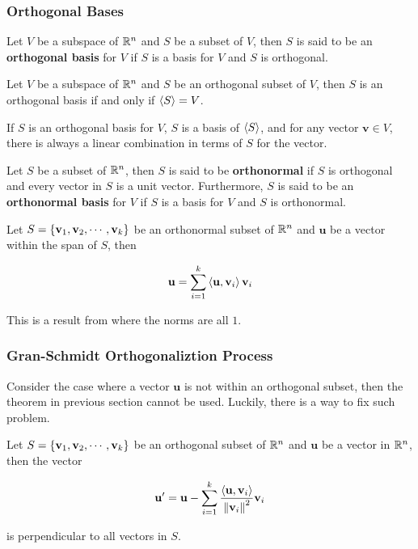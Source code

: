 \documentclass[a4paper,12pt]{article}
\begin{document}
\subsubsection{Orthogonal Bases}
\begin{dft}
  Let $V$ be a subspace of $\mathbb{R}^{n}$ and $S$ be a subset of $V$, then $S$ is said to be an \textbf{orthogonal basis} for $V$ if $S$ is a basis for $V$ and $S$ is orthogonal.
\end{dft}\n

\begin{thm}
  Let $V$ be a subspace of $\mathbb{R}^{n}$ and $S$ be an orthogonal subset of $V$, then $S$ is an orthogonal basis if and only if $\left\langle S\right\rangle=V$.
\end{thm}\n

\begin{crl}
  If $S$ is an orthogonal basis for $V$, $S$ is a basis of $\left\langle S\right\rangle$, and for any vector $\mathbf{v}\in V$, there is always a linear combination in terms of $S$ for the vector.
\end{crl}\n

\begin{dft}
  Let $S$ be a subset of $\mathbb{R}^{n}$, then $S$ is said to be \textbf{orthonormal} if $S$ is orthogonal and every vector in $S$ is a unit vector. Furthermore, $S$ is said to be an \textbf{orthonormal basis} for $V$ if $S$ is a basis for $V$ and $S$ is orthonormal.
\end{dft}\n

\begin{thm}
  Let $S=\left\{ \mathbf{v}_{1},\mathbf{v}_{2},\cdots,\mathbf{v}_{k}\right\}$ be an orthonormal subset of $\mathbb{R}^{n}$ and $\mathbf{u}$ be a vector within the span of $S$, then
  
  $$\mathbf{u}=\sum_{i=1}^{k}\left\langle \mathbf{u},\mathbf{v}_{i}\right\rangle\mathbf{v}_{i}$$\s
  
  \prf This is a result from \rthm[\sctd{5}] where the norms are all $1$.
\end{thm}

\subsubsection{Gran-Schmidt Orthogonaliztion Process}
Consider the case where a vector $\mathbf{u}$ is not within an orthogonal subset, then the theorem in previous section cannot be used. Luckily, there is a way to fix such problem.\n

\begin{thm}
  Let $S=\left\{ \mathbf{v}_{1},\mathbf{v}_{2},\cdots,\mathbf{v}_{k}\right\}$ be an orthogonal subset of $\mathbb{R}^{n}$ and $\mathbf{u}$ be a vector in $\mathbb{R}^{n}$, then the vector

  $$\mathbf{u}'=\mathbf{u}-\sum_{i=1}^{k}\frac{\left\langle \mathbf{u},\mathbf{v}_{i}\right\rangle}{\left\| \mathbf{v}_{i}\right\|^{2}}\mathbf{v}_{i}$$\s

  is perpendicular to all vectors in $S$.
\end{thm}\n
\end{document}
